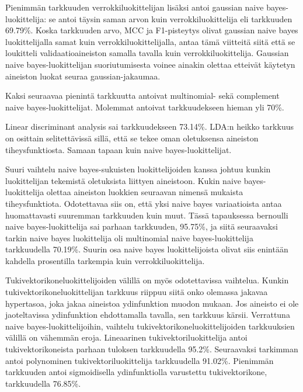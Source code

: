 \documentclass[finnish,twoside,openright]{HYgraduMLDS}
\begin{document}
Pienimmän tarkkuuden verrokkiluokittelijan lisäksi antoi gaussian naive bayes-luokittelija: se antoi täysin saman arvon kuin verrokkiluokittelija eli tarkkuuden 69.79\%. Koska tarkkuuden arvo, MCC ja F1-pisteytys olivat gaussian naive bayes luokittelijalla samat kuin verrokkiluokittelijalla, antaa tämä viitteitä siitä että se loukitteli validaatioaineiston samalla tavalla kuin verrokkiluokittelija. Gaussian naive bayes-luokittelijan suoriutumisesta voinee ainakin olettaa etteivät käytetyn aineiston luokat seuraa gaussian-jakaumaa.

Kaksi seuraavaa pienintä tarkkuutta antoivat multinomial- sekä complement naive bayes-luokittelijat. Molemmat antoivat tarkkuudekseen hieman yli 70\%.

Linear discriminant analysis sai tarkkuudekseen 73.14\%. LDA:n heikko tarkkuus on osittain selitettävissä sillä, että se tekee oman oletuksensa aineiston tiheysfunktiosta. Samaan tapaan kuin naive bayes-luokittelijat.

Suuri vaihtelu naive bayes-sukuisten luokittelijoiden kanssa johtuu kunkin luokittelijan tekemistä oletuksista liittyen aineistoon. Kukin naive bayes-luokittelija olettaa aineiston luokkien seuraavan nimensä mukaista tiheysfunktiota. Odotettavaa siis on, että yksi naive bayes variaatioista antaa huomattavasti suuremman tarkkuuden kuin muut. Tässä tapauksessa bernoulli naive bayes-luokittelija sai parhaan tarkkuuden, 95.75\%, ja siitä seuraavaksi tarkin naive bayes luokittelija oli multinomial naive bayes-luokittelija tarkkuudella 70.19\%. Suurin osa naive bayes luokittelijoista olivat siis enintään kahdella prosentilla tarkempia kuin verrokkiluokittelija.

Tukivektorikoneluokittelijoiden välillä on myös odotettavissa vaihtelua. Kunkin tukivektorikoneluokittelijan tarkkuus riippuu siitä onko olemassa jakavaa hypertasoa, joka jakaa aineistoa ydinfunktion muodon mukaan. Jos aineisto ei ole jaoteltavissa ydinfunktion ehdottamalla tavalla, sen tarkkuus kärsii. Verrattuna naive bayes-luokittelijoihin, vaihtelu tukivektorikoneluokittelijoiden tarkkuuksien välillä on vähemmän eroja. Lineaarinen tukivektoriluokittelija antoi tukivektorikoneista parhaan tuloksen tarkkuudella 95.2\%. Seuraavaksi tarkimman antoi polynominen tukivektoriluokittelija tarkkuudella 91.02\%. Pienimmän tarkkuuden antoi sigmoidisella ydinfunktiolla varustettu tukivektorikone, tarkkuudella 76.85\%.
\end{document}
